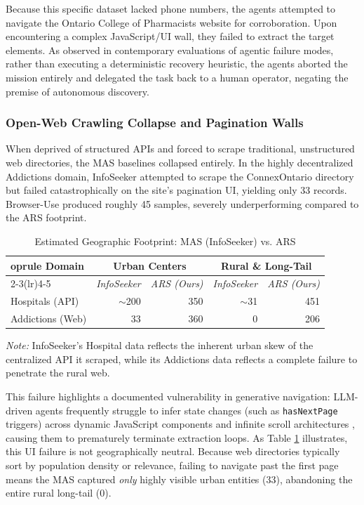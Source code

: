 \documentclass[12pt,oneside]{report}
\begin{document}
Because this specific dataset lacked phone numbers, the agents attempted to navigate the Ontario College of Pharmacists website for corroboration. Upon encountering a complex JavaScript/UI wall, they failed to extract the target elements. As observed in contemporary evaluations of agentic failure modes, rather than executing a deterministic recovery heuristic, the agents aborted the mission entirely and delegated the task back to a human operator, negating the premise of autonomous discovery.

\subsubsection{Open-Web Crawling Collapse and Pagination Walls}
When deprived of structured APIs and forced to scrape traditional, unstructured web directories, the MAS baselines collapsed entirely. In the highly decentralized Addictions domain, InfoSeeker attempted to scrape the ConnexOntario directory but failed catastrophically on the site's pagination UI, yielding only 33 records. Browser-Use produced roughly 45 samples, severely underperforming compared to the ARS footprint.

\begin{table}[htbp]
\caption{Estimated Geographic Footprint: MAS (InfoSeeker) vs. ARS}
\label{tab:mas_geo_estimate}
\centering
\begin{tabularx}{\textwidth}{@{}Xrrrr@{}}
	oprule
\textbf{Domain} & \multicolumn{2}{c||}{\textbf{Urban Centers}} & \multicolumn{2}{c|}{\textbf{Rural \& Long-Tail}} \\
\cmidrule(lr){2-3}\cmidrule(lr){4-5}
 & \textit{InfoSeeker} & \textit{ARS (Ours)} & \textit{InfoSeeker} & \textit{ARS (Ours)} \\
\midrule
Hospitals (API) & $\sim$200 & 350 & $\sim$31 & 451 \\
Addictions (Web) & 33 & 360 & 0 & 206 \\
\bottomrule
\end{tabularx}
\footnotesize{\textit{Note:} InfoSeeker's Hospital data reflects the inherent urban skew of the centralized API it scraped, while its Addictions data reflects a complete failure to penetrate the rural web.}
\end{table}

This failure highlights a documented vulnerability in generative navigation: LLM-driven agents frequently struggle to infer state changes (such as \texttt{hasNextPage} triggers) across dynamic JavaScript components and infinite scroll architectures \cite{70}, causing them to prematurely terminate extraction loops. As Table \ref{tab:mas_geo_estimate} illustrates, this UI failure is not geographically neutral. Because web directories typically sort by population density or relevance, failing to navigate past the first page means the MAS captured \textit{only} highly visible urban entities (33), abandoning the entire rural long-tail (0).
\end{document}
